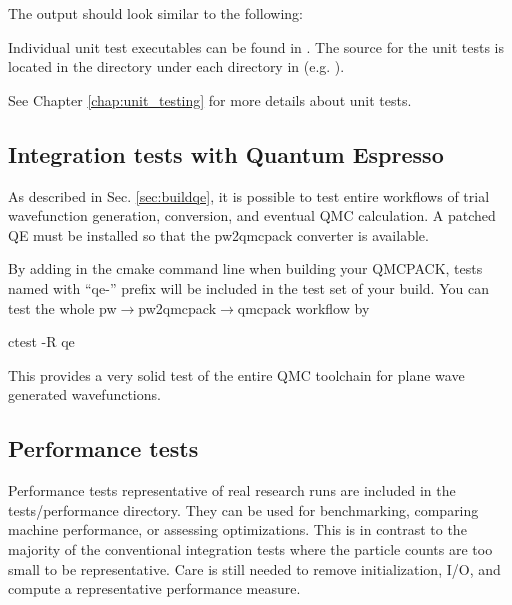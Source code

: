 The output should look similar to the following:


Individual unit test executables can be found in .
The source for the unit tests is located in the  directory under each directory in  (e.g. ).

See Chapter \ref{chap:unit_testing} for more details about unit tests.

\subsection{Integration tests with Quantum Espresso}
\label{sec:integtestqe}
As described in Sec. \ref{sec:buildqe}, it is possible to test entire
workflows of trial wavefunction generation, conversion, and eventual
QMC calculation. A patched QE must be installed so that the
pw2qmcpack converter is available.

By adding  in the cmake command line when building your QMCPACK,
tests named with ``qe-'' prefix will be included in the test set of your build.
You can test the whole pw$\to$pw2qmcpack$\to$qmcpack workflow by

\begin{shade}
ctest -R qe
\end{shade}
This provides a very solid test of the entire QMC
toolchain for plane wave generated wavefunctions.

\subsection{Performance tests}
\label{sec:perftests}
Performance tests representative of real research runs are included in the
tests/performance directory. They can be used for benchmarking, comparing machine
performance, or assessing optimizations. This is in
contrast to the majority of the conventional integration tests where the particle
counts are too small to be representative. Care is still needed to
remove initialization, I/O, and compute a representative performance
measure.

